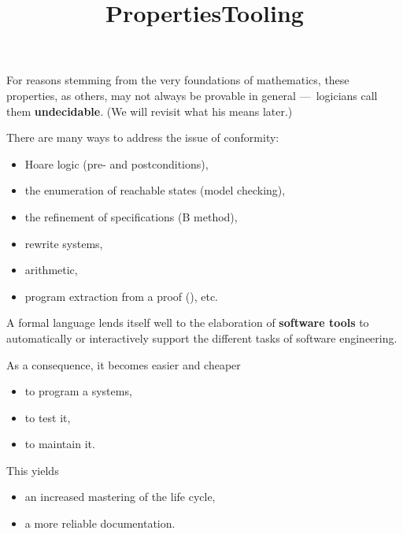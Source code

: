 \documentclass[wide]{slides}
\begin{document}
\begin{slide}
  \title{Properties}

   For reasons stemming from the very foundations of mathematics,
   these properties, as others, may not always be provable in general
   ---~logicians call them \textbf{undecidable}. (We will revisit what
   his means later.)

   \bigskip

   There are many ways to address the issue of conformity:
   \begin{itemize}

     \item Hoare logic (pre- and postconditions),

     \item the enumeration of reachable states (model checking),

     \item the refinement of specifications (B method),

     \item rewrite systems,

     \item arithmetic,

     \item program extraction from a proof (\Coq), etc.

   \end{itemize}

\end{slide}

\begin{slide}
  \title{Tooling}

  A formal language lends itself well to the elaboration of
  \textbf{software tools} to automatically or interactively support
  the different tasks of software engineering.

  \bigskip

  As a consequence, it becomes easier and cheaper
  \begin{itemize}

    \item to program a systems,

    \item to test it,

    \item to maintain it.

  \end{itemize}

  \bigskip

  This yields
  \begin{itemize}

    \item an increased mastering of the life cycle,

    \item a more reliable documentation.

  \end{itemize}

\end{slide}
\end{document}
